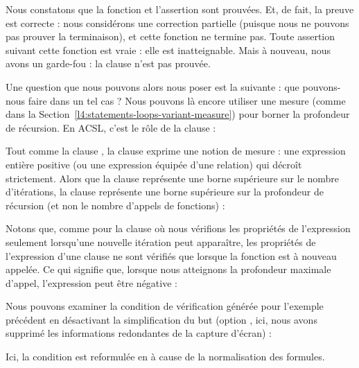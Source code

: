 



Nous constatons que la fonction et l'assertion sont prouvées. Et, de fait,
la preuve est correcte : nous considérons une correction partielle (puisque nous ne
pouvons pas prouver la terminaison), et cette fonction ne termine pas. Toute
assertion suivant cette fonction est vraie : elle est inatteignable. Mais à
nouveau, nous avons un garde-fou : la clause  n'est
pas prouvée.


Une question que nous pouvons alors nous poser est la suivante : que pouvons-nous
faire dans un tel cas ? Nous pouvons là encore utiliser une mesure (comme dans la
Section~\ref{l4:statements-loops-variant-measure}) pour borner la profondeur de
récursion. En ACSL, c'est le rôle de la clause  :




Tout comme la clause , la clause 
exprime une notion de mesure : une expression entière positive (ou une
expression équipée d'une relation) qui décroît strictement. Alors que la clause
 représente une borne supérieure sur le nombre
d'itérations, la clause  représente une borne supérieure
sur la profondeur de récursion (et non le nombre d'appels de fonctions) :




Notons que, comme pour la clause  où nous vérifions les
propriétés de l'expression seulement lorsqu'une nouvelle itération peut
apparaître, les propriétés de l'expression d'une clause 
ne sont vérifiés que lorsque la fonction est à nouveau appelée. Ce qui signifie
que, lorsque nous atteignons la profondeur maximale d'appel, l'expression peut
être négative :




Nous pouvons examiner la condition de vérification générée pour l'exemple précédent
en désactivant la simplification du but (option , ici,
nous avons supprimé les informations redondantes de la capture d'écran) :




Ici, la condition  est reformulée en
 à cause de la normalisation des formules.


